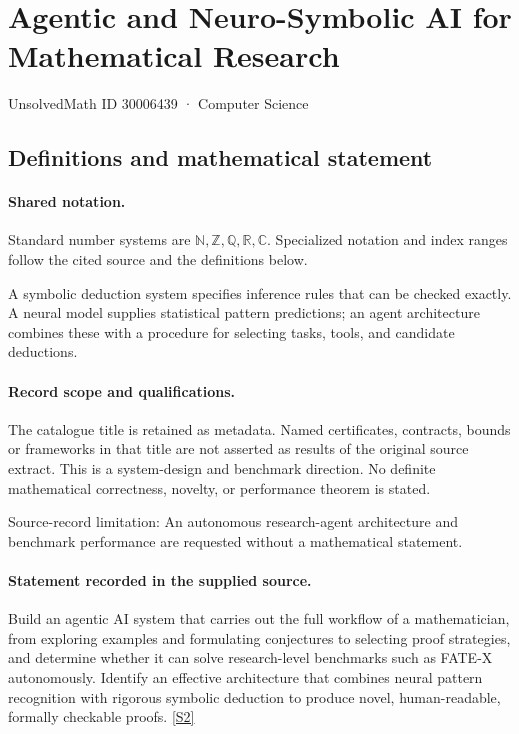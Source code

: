 \documentclass[11pt]{article}
\newcommand{\sref}[2]{\hyperlink{source:#1:#2}{[S#2]}}
\begin{document}
\setcounter{section}{30006438}
\section{Agentic and Neuro-Symbolic AI for Mathematical Research}\label{30006439}
{\small\sffamily UnsolvedMath ID 30006439 · Computer Science}
\subsection{Definitions and mathematical statement}

\paragraph{Shared notation.}Standard number systems are $\mathbb N,\mathbb Z,\mathbb Q,\mathbb R,\mathbb C$. Specialized notation and index ranges follow the cited source and the definitions below.


A symbolic deduction system specifies inference rules that can be checked exactly. A neural model supplies statistical pattern predictions; an agent architecture combines these with a procedure for selecting tasks, tools, and candidate deductions.
\paragraph{Record scope and qualifications.}
The catalogue title is retained as metadata. Named certificates, contracts, bounds or frameworks in that title are not asserted as results of the original source extract.
This is a system-design and benchmark direction. No definite mathematical correctness, novelty, or performance theorem is stated.

Source-record limitation: An autonomous research-agent architecture and benchmark performance are requested without a mathematical statement.
\paragraph{Statement recorded in the supplied source.}
Build an agentic AI system that carries out the full workflow of a mathematician, from exploring examples and formulating conjectures to selecting proof strategies, and determine whether it can solve research-level benchmarks such as FATE-X autonomously. Identify an effective architecture that combines neural pattern recognition with rigorous symbolic deduction to produce novel, human-readable, formally checkable proofs. \sref{30006439}{2}
\end{document}
